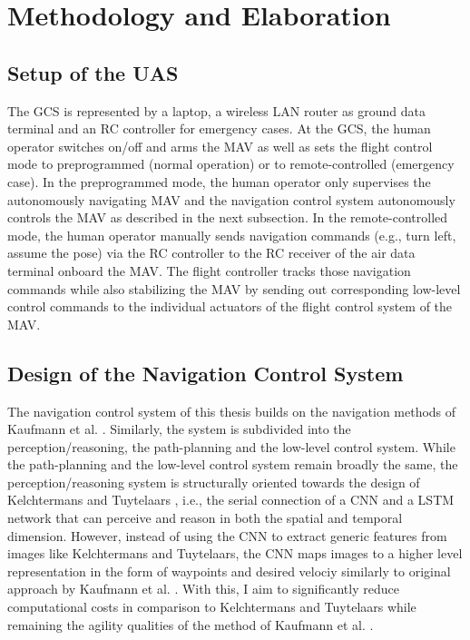 \section{Methodology and Elaboration}


\subsection{Setup of the UAS}

The GCS is represented by a laptop, a wireless LAN router as ground data terminal and an RC controller for emergency cases.
At the GCS, the human operator switches on/off and arms the MAV as well as sets the flight control mode to preprogrammed (normal operation)
or to remote-controlled (emergency case).
In the preprogrammed mode, the human operator only supervises the autonomously navigating MAV and
the navigation control system autonomously controls the MAV as described in the next subsection.
In the remote-controlled mode, 
the human operator manually sends navigation commands (e.g., turn left, assume the pose) via the RC controller
to the RC receiver of the air data terminal onboard the MAV.
The flight controller tracks those navigation commands while also stabilizing the MAV
by sending out corresponding low-level control commands  to the individual actuators of the flight control system of the MAV.





\subsection{Design of the Navigation Control System}

The navigation control system of this thesis builds on the navigation methods of Kaufmann et al. \cite{Kaufmann2018}.
Similarly, the system is subdivided into the perception/reasoning, the path-planning and the low-level control system.
While the path-planning and the low-level control system remain broadly the same,
the perception/reasoning system is structurally oriented towards the design of Kelchtermans and Tuytelaars \cite{Kelchtermans2017},
i.e., the serial connection of a CNN and a LSTM network that can perceive and reason in both the spatial and temporal dimension.
However, instead of using the CNN to extract generic features from images like Kelchtermans and Tuytelaars,
the CNN maps images to a higher level representation in the form of waypoints and desired velociy 
similarly to original approach by Kaufmann et al. \cite{Kaufmann2018}.
With this, I aim to significantly reduce computational costs in comparison to Kelchtermans and Tuytelaars
while remaining the agility qualities of the method of Kaufmann et al. \cite{Kaufmann2018}.


